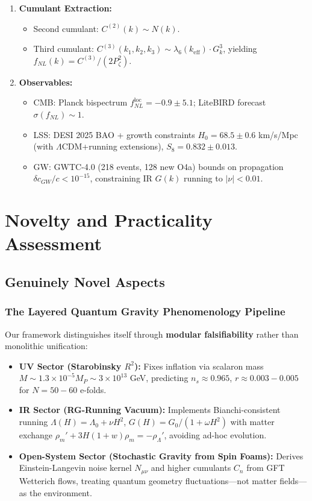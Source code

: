 \documentclass[12pt,a4paper]{article}
\begin{document}
\begin{enumerate}
\item \textbf{Cumulant Extraction:}
\begin{itemize}
\item Second cumulant: \(C^{(2)}(k) \sim N(k)\).
\item Third cumulant: \(C^{(3)}(k_1, k_2, k_3) \sim \lambda_6(k_{\text{eff}}) \cdot G_k^3\), yielding \(f_{NL}(k) = C^{(3)}/(2P_\zeta^2)\).
\end{itemize}

\item \textbf{Observables:}
\begin{itemize}
\item CMB: Planck bispectrum \(f_{NL}^{\text{loc}} = -0.9 \pm 5.1\); LiteBIRD forecast \(\sigma(f_{NL}) \sim 1\).
\item LSS: DESI 2025 BAO + growth constraints \(H_0 = 68.5 \pm 0.6\) km/s/Mpc (with \(\Lambda\)CDM+running extensions), \(S_8 = 0.832 \pm 0.013\).
\item GW: GWTC-4.0 (218 events, 128 new O4a) bounds on propagation \(\delta c_{GW}/c < 10^{-15}\), constraining IR \(G(k)\) running to \(|\nu| < 0.01\).
\end{itemize}
\end{enumerate}

\section{Novelty and Practicality Assessment}

\subsection{Genuinely Novel Aspects}

\subsubsection{The Layered Quantum Gravity Phenomenology Pipeline}

Our framework distinguishes itself through \textbf{modular falsifiability} rather than monolithic unification:

\begin{itemize}
\item \textbf{UV Sector (Starobinsky \(R^2\)):} Fixes inflation via scalaron mass \(M \sim 1.3 \times 10^{-5} M_P \sim 3 \times 10^{13}\) GeV, predicting \(n_s \approx 0.965\), \(r \approx 0.003-0.005\) for \(N=50-60\) e-folds.

\item \textbf{IR Sector (RG-Running Vacuum):} Implements Bianchi-consistent running \(\Lambda(H) = \Lambda_0 + \nu H^2\), \(G(H) = G_0/(1 + \omega H^2)\) with matter exchange \(\rho_m' + 3H(1 + w)\rho_m = -\rho_\Lambda'\), avoiding ad-hoc evolution.

\item \textbf{Open-System Sector (Stochastic Gravity from Spin Foams):} Derives Einstein-Langevin noise kernel \(N_{\mu\nu}\) and higher cumulants \(C_n\) from GFT Wetterich flows, treating quantum geometry fluctuations—not matter fields—as the environment.
\end{itemize}
\end{document}
